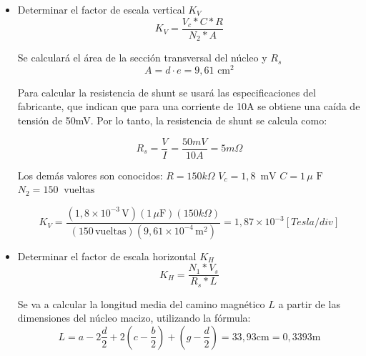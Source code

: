 \begin{itemize}
    \item Determinar el factor de escala vertical $K_V$
        \begin{equation}
            K_V = \frac{V_{c}*C*R}{N_{2}*A}
        \end{equation}
    
    Se calculará el área de la sección transversal del núcleo y $R_s$
    \begin{equation}
        A = d \cdot e = 9,61 \text{ cm}^2  
    \end{equation}

    Para calcular la resistencia de shunt se usará las especificaciones del fabricante, que indican que para una corriente de 10A se obtiene una caída de tensión de 50mV. Por lo tanto, la resistencia de shunt se calcula como:

    \begin{equation}
        R_s = \frac{V}{I} = \frac{50 mV}{10A} = 5 m\Omega
    \end{equation}

    Los demás valores son conocidos: \newline
    $R = 150 k\Omega$                          \newline
    $V_c = 1,8\,\text{ mV}$           \newline
    $C = 1\,\mu\text{ F}$             \newline
    $N_2 = 150\ \text{ vueltas}$      \newline

    \begin{equation}
        K_V = \frac{(1,8\times 10^{-3}\,\text{V})(1\,\mu\text{F})(150k\Omega)}{(150\,\text{vueltas})(9,61\times 10^{-4}\,\text{m}^2)} = 1,87\times 10^{-3} [Tesla/div]
    \end{equation}
         
    \item Determinar el factor de escala horizontal $K_H$
        \begin{equation}
            K_H = \frac{N_1*V_s}{R_s*L}
        \end{equation}

    Se va a calcular la longitud media del camino magnético $L$ a partir de las dimensiones del núcleo macizo, utilizando la fórmula:
    \begin{equation}
        L = a - 2\frac{d}{2} + 2(c-\frac{b}{2}) + (g-\frac{d}{2}) = 33,93 \text{cm}= 0,3393 \text{m}
    \end{equation}


\end{itemize}
